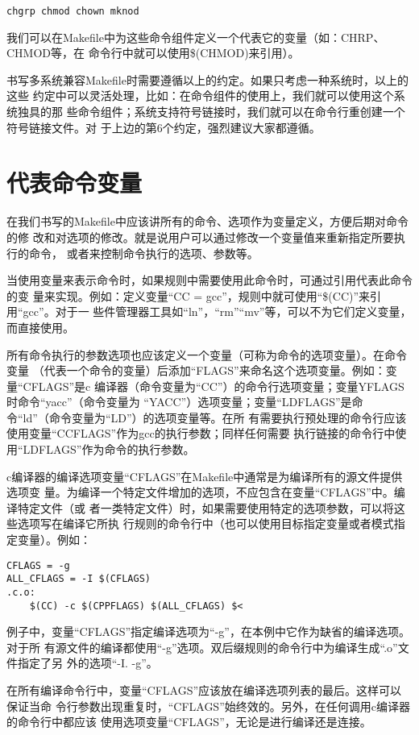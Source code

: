 \begin{Verbatim}[]
chgrp chmod chown mknod
\end{Verbatim}

我们可以在Makefile中为这些命令组件定义一个代表它的变量（如：CHRP、CHMOD等，在
命令行中就可以使用\$(CHMOD)来引用）。

书写多系统兼容Makefile时需要遵循以上的约定。如果只考虑一种系统时，以上的这些
约定中可以灵活处理，比如：在命令组件的使用上，我们就可以使用这个系统独具的那
些命令组件；系统支持符号链接时，我们就可以在命令行重创建一个符号链接文件。对
于上边的第6个约定，强烈建议大家都遵循。

\section{代表命令变量}
在我们书写的Makefile中应该讲所有的命令、选项作为变量定义，方便后期对命令的修
改和对选项的修改。就是说用户可以通过修改一个变量值来重新指定所要执行的命令，
或者来控制命令执行的选项、参数等。

当使用变量来表示命令时，如果规则中需要使用此命令时，可通过引用代表此命令的变
量来实现。例如：定义变量“CC = gcc”，规则中就可使用“\$(CC)”来引用“gcc”。对于一
些件管理器工具如“ln”，“rm”“mv”等，可以不为它们定义变量，而直接使用。

所有命令执行的参数选项也应该定义一个变量（可称为命令的选项变量）。在命令变量
（代表一个命令的变量）后添加“FLAGS”来命名这个选项变量。例如：变量“CFLAGS”是c
编译器（命令变量为“CC”）的命令行选项变量；变量YFLAGS时命令“yacc”（命令变量为
“YACC”）选项变量；变量“LDFLAGS”是命令“ld”（命令变量为“LD”）的选项变量等。在所
有需要执行预处理的命令行应该使用变量“CCFLAGS”作为gcc的执行参数；同样任何需要
执行链接的命令行中使用“LDFLAGS”作为命令的执行参数。

c编译器的编译选项变量“CFLAGS”在Makefile中通常是为编译所有的源文件提供选项变
量。为编译一个特定文件增加的选项，不应包含在变量“CFLAGS”中。编译特定文件（或
者一类特定文件）时，如果需要使用特定的选项参数，可以将这些选项写在编译它所执
行规则的命令行中（也可以使用目标指定变量或者模式指定变量）。例如：
\begin{Verbatim}[]
CFLAGS = -g
ALL_CFLAGS = -I $(CFLAGS)
.c.o:
    $(CC) -c $(CPPFLAGS) $(ALL_CFLAGS) $<
\end{Verbatim}

例子中，变量“CFLAGS”指定编译选项为“-g”，在本例中它作为缺省的编译选项。对于所
有源文件的编译都使用“-g”选项。双后缀规则的命令行中为编译生成“.o”文件指定了另
外的选项“-I. -g”。

在所有编译命令行中，变量“CFLAGS”应该放在编译选项列表的最后。这样可以保证当命
令行参数出现重复时，“CFLAGS”始终效的。另外，在任何调用c编译器的命令行中都应该
使用选项变量“CFLAGS”，无论是进行编译还是连接。

